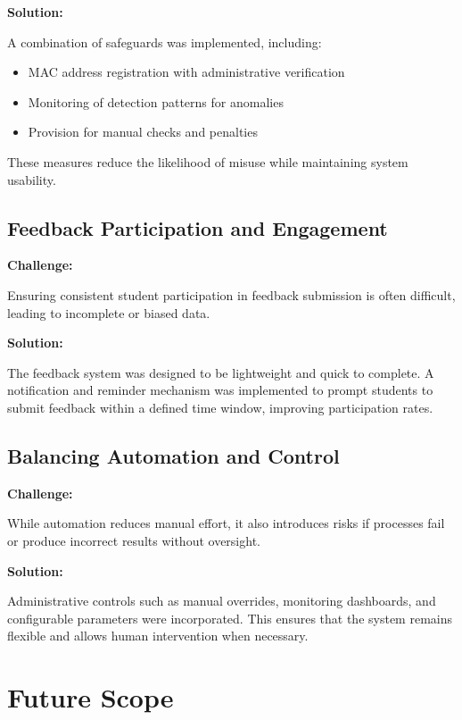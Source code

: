 \textbf{Solution:}

A combination of safeguards was implemented, including:

\begin{itemize}
    \item MAC address registration with administrative verification
    \item Monitoring of detection patterns for anomalies
    \item Provision for manual checks and penalties
\end{itemize}

These measures reduce the likelihood of misuse while maintaining system usability.

\section{Feedback Participation and Engagement}

\textbf{Challenge:}

Ensuring consistent student participation in feedback submission is often difficult, leading to
incomplete or biased data.

\textbf{Solution:}

The feedback system was designed to be lightweight and quick to complete. A notification and
reminder mechanism was implemented to prompt students to submit feedback within a defined
time window, improving participation rates.

\section{Balancing Automation and Control}

\textbf{Challenge:}

While automation reduces manual effort, it also introduces risks if processes fail or produce incorrect
results without oversight.

\textbf{Solution:}

Administrative controls such as manual overrides, monitoring dashboards, and configurable
parameters were incorporated. This ensures that the system remains flexible and allows human
intervention when necessary.

\chapter{Future Scope}

